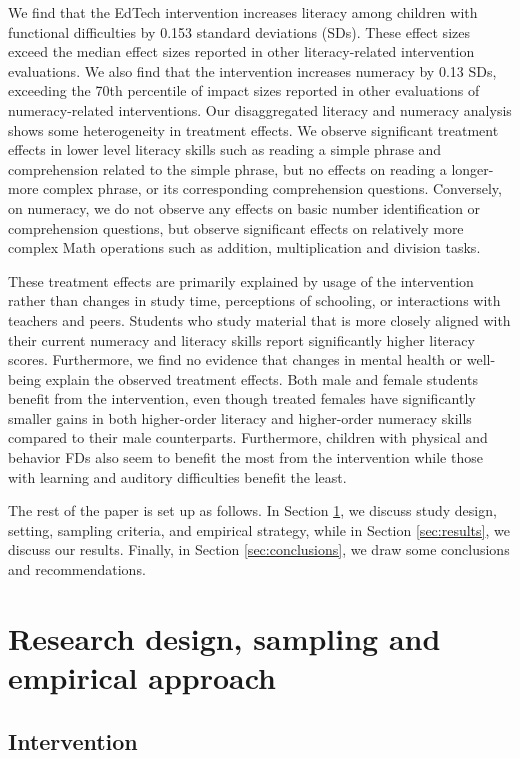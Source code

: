 \documentclass[hidelinks,12pt]{article}
\begin{document}
\begin{singlespace}
We find that the EdTech intervention increases literacy among children with functional difficulties by 0.153 standard deviations (SDs). These effect sizes exceed the median effect sizes reported in other literacy-related intervention evaluations. We also find that the intervention increases numeracy by 0.13 SDs, exceeding the 70th percentile of impact sizes reported in other evaluations of numeracy-related interventions. Our disaggregated literacy and numeracy analysis shows some heterogeneity in treatment effects. We observe significant treatment effects in lower level literacy skills such as reading a simple phrase and comprehension related to the simple phrase, but no effects on reading a longer-more complex phrase, or its corresponding comprehension questions. Conversely, on numeracy, we do not observe any effects on basic number identification or comprehension questions, but observe significant effects on relatively more complex Math operations such as addition, multiplication and division tasks.

These treatment effects are primarily explained by usage of the intervention rather than changes in study time, perceptions of schooling, or interactions with teachers and peers. Students who study material that is more closely aligned with their current numeracy and literacy skills report significantly higher literacy scores. Furthermore, we find no evidence that changes in mental health or well-being explain the observed treatment effects. Both male and female students benefit from the intervention, even though treated females have significantly smaller gains in both higher-order literacy and higher-order numeracy skills compared to their male counterparts. Furthermore, children with physical and behavior FDs also seem to benefit the most from the intervention while those with learning and auditory difficulties benefit the least. 

The rest of the paper is set up as follows. In Section \ref{sec:design}, we discuss study design, setting, sampling criteria, and empirical strategy, while in Section \ref{sec:results}, we discuss our results. Finally, in Section \ref{sec:conclusions}, we draw some conclusions and recommendations.


\section{Research design, sampling and empirical approach}\label{sec:design}

\subsection{Intervention}\label{subsec:intervention}


\end{singlespace}
\end{document}
